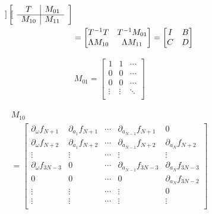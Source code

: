 \documentclass[11pt,a4paper,titlepage]{jsreport}
\theoremstyle{definition}
\begin{document}
\begin{equation}
\begin{split}
\begin{bmatrix}
    \end{bmatrix}
    \begin{bmatrix}
      & \multicolumn{1}{c|}{T} & M_{01} &  \\ \cline{2-3}
      & \multicolumn{1}{c|}{M_{10}} & M_{11} &
    \end{bmatrix}\\
    &= \begin{bmatrix}
      T^{-1}T & T^{-1}M_{01} \\
      \Lambda M_{10} & \Lambda M_{11}
    \end{bmatrix}
    = \begin{bmatrix}
      I & B \\
      C & D
    \end{bmatrix}
  \end{split}
  \label{eq:ADF-1}
\end{equation}

\begin{equation}
  \begin{split}
    &M_{01} =
    \begin{bmatrix}
      1 & 1 & \cdots \\
      0 & 0 & \cdots \\
      0 & 0 & \cdots \\
      \vdots & \vdots & \ddots \\
    \end{bmatrix}
  \end{split}
\end{equation}

\begin{equation}
  \begin{split}
    &M_{10} \\
    &= \begin{bmatrix}
      \partial_{\omega} f_{N+1} & \partial_{a_{1}} f_{N+1}  & \cdots & \partial_{a_{N-1}} f_{N+1} & 0\\
      \partial_{\omega} f_{N+2} & \partial_{a_{1}} f_{N+2}  & \cdots & \partial_{a_{N-1}} f_{N+2} &\partial_{a_{N}} f_{N+2}\\
      \vdots & \vdots & \cdots & \vdots & \vdots \\
      \partial_{\omega} f_{3N-3} & 0  & \cdots &  \partial_{a_{N-1}} f_{3N-3} & \partial_{a_{N}} f_{3N-3} \\
      0 & 0 & \cdots & 0 & \partial_{a_{N}} f_{3N-2} \\
      \vdots & \vdots  & \cdots & \vdots & 0 \\
      \vdots & \vdots & \cdots & \vdots & \vdots \\
    \end{bmatrix}
  \end{split}
\end{equation}
\end{document}
